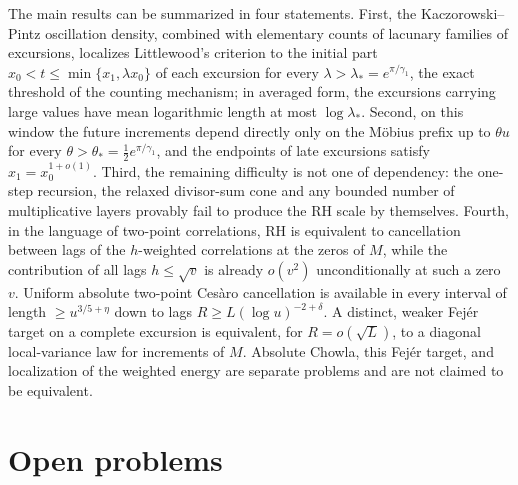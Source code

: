 \documentclass[11pt]{amsart}
\numberwithin{equation}{section}
\theoremstyle{plain}
\theoremstyle{definition}
\theoremstyle{remark}
\begin{document}
The main results can be summarized in four statements. First, the
Kaczorowski--Pintz oscillation density, combined with elementary counts of
lacunary families of excursions, localizes Littlewood's criterion to the
initial part $x_0<t\le\min\{x_1,\lambda x_0\}$ of each excursion for every
$\lambda>\lambda_*=e^{\pi/\gamma_1}$, the exact threshold of the counting
mechanism; in averaged form, the excursions carrying large values have mean
logarithmic length at most $\log\lambda_*$. Second, on this window the
future increments depend directly only on the M\"obius prefix up to
$\theta u$ for every $\theta>\theta_*=\frac12e^{\pi/\gamma_1}$, and the
endpoints of late excursions satisfy $x_1=x_0^{1+o(1)}$. Third, the
remaining difficulty is not one of dependency: the one-step recursion, the
relaxed divisor-sum cone and any bounded number of multiplicative layers
provably fail to produce the RH scale by themselves. Fourth, in the language
of two-point correlations, RH is equivalent to cancellation between lags of
the $h$-weighted correlations at the zeros of $M$, while the contribution
of all lags $h\le\sqrt v$ is already $o(v^2)$ unconditionally at such a zero
$v$. Uniform absolute two-point Ces\`aro cancellation is available in every
interval of length $\ge u^{3/5+\eta}$ down to lags
$R\ge L(\log u)^{-2+\delta}$. A distinct, weaker Fej\'er target on a complete
excursion is equivalent, for $R=o(\sqrt L)$, to a diagonal local-variance
law for increments of $M$. Absolute Chowla, this Fej\'er target, and
localization of the weighted energy are separate problems and are not
claimed to be equivalent.

\section{Open problems}
\label{sec:open_questions}
\end{document}

